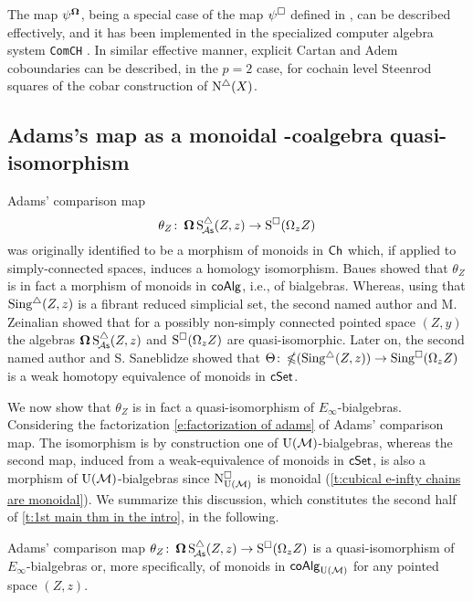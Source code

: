 The map $\psi^{\operatorname{\mathbf{\Omega}}}$, being a special case of the map $\psi^\square$ defined in \cite{medina2021may_st}, can be described effectively, and it has been implemented in the specialized computer algebra system \texttt{ComCH} \cite{medina2021comch}.
In similar effective manner, explicit Cartan and Adem coboundaries \cite{medina2020cartan, medina2021adem} can be described, in the $p = 2$ case, for cochain level Steenrod squares of the cobar construction of $\operatorname{N^{\triangle}}(X)$.


\subsection{Adams's map as a monoidal \pdfEinfty-coalgebra quasi-isomorphism}

Adams' comparison map
\[
\theta_Z \colon \operatorname{\mathbf{\Omega}} \operatorname{S^{\triangle}_{\!{\mathcal{A}\mathsf{s}}}}(Z,z) \to \operatorname{S^{\square}}(\Omega_z Z)
\]
was originally identified to be a morphism of monoids in $\mathsf{Ch}$ which, if applied to simply-connected spaces, induces a homology isomorphism.
Baues showed that $\theta_Z$ is in fact a morphism of monoids in $\mathsf{coAlg}$, i.e., of bialgebras.
Whereas, using that $\operatorname{Sing^{\triangle}}(Z,z)$ is a fibrant reduced simplicial set, the second named author and M. Zeinalian \cite{rivera2018cubical} showed that for a possibly non-simply connected pointed space $(Z,y)$ the algebras $\operatorname{\mathbf{\Omega}} \operatorname{S^{\triangle}_{\!{\mathcal{A}\mathsf{s}}}}(Z,z)$ and $\operatorname{S^{\square}}(\Omega_zZ)$ are quasi-isomorphic.
Later on, the second named author and S. Saneblidze
\cite{rivera2019path} showed that $\Theta \colon \operatorname{\mathbb{\Omega}}(\operatorname{Sing^{\triangle}}(Z,z)) \to \operatorname{Sing^{\square}}(\Omega_z Z)$ is a weak homotopy equivalence of monoids in $\mathsf{cSet}$.

We now show that $\theta_Z$ is in fact a quasi-isomorphism of $E_{\infty}$-bialgebras.
Considering the factorization \eqref{e:factorization of adams} of Adams' comparison map.
The isomorphism is by construction one of ${\operatorname{U}(\mathcal{M})}$-bialgebras, whereas the second map, induced from a weak-equivalence of monoids in $\mathsf{cSet}$, is also a morphism of ${\operatorname{U}(\mathcal{M})}$-bialgebras
since $\operatorname{N^{\square}_{{\operatorname{U}(\mathcal{M})}}}$ is monoidal (\cref{t:cubical e-infty chains are monoidal}).
We summarize this discussion, which constitutes the second half of \cref{t:1st main thm in the intro}, in the following.

\begin{lemma}\label{l:adams comparison is an e-infty bialgebra map}
	Adams' comparison map $\theta_Z \colon \operatorname{\mathbf{\Omega}} \operatorname{S^{\triangle}_{\!{\mathcal{A}\mathsf{s}}}}(Z,z) \to \operatorname{S^{\square}}(\Omega_z Z)$ is a quasi-isomorphism of $E_{\infty}$-bialgebras or, more specifically, of monoids in $\mathsf{coAlg}_{\operatorname{U}(\mathcal{M})}$ for any pointed space $(Z,z)$.
\end{lemma}